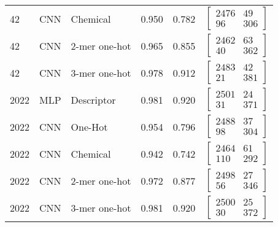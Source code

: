 \begin{table}[ht]
\begin{tabular}{llllll}
    42 & CNN & Chemical & 0.950 & 0.782 &
	$\begin{bmatrix}
        2476 & 49\\ 
        96 & 306
    \end{bmatrix}$
    \\

    42 & CNN & 2-mer one-hot & 0.965 & 0.855 & 
	$\begin{bmatrix}
        2462 & 63\\ 
        40 & 362
    \end{bmatrix}$
    \\

    42 & CNN & 3-mer one-hot & 0.978 & 0.912 & 
	$\begin{bmatrix}
        2483 & 42\\ 
        21 & 381
    \end{bmatrix}$
    \\\midrule

    
    2022 & MLP & Descriptor & 0.981 & 0.920 & 
	$\begin{bmatrix}
        2501 & 24\\ 
        31 & 371
    \end{bmatrix}$
    \\

    2022 & CNN & One-Hot & 0.954 & 0.796 &
	$\begin{bmatrix}
        2488 & 37\\ 
        98 & 304
    \end{bmatrix}$
    \\

    2022 & CNN & Chemical & 0.942 & 0.742 &
	$\begin{bmatrix}
        2464 & 61\\ 
        110 & 292
    \end{bmatrix}$
    \\

    2022 & CNN & 2-mer one-hot & 0.972 & 0.877 & 
	$\begin{bmatrix}
        2498 & 27\\ 
        56 & 346
    \end{bmatrix}$
    \\

    2022 & CNN & 3-mer one-hot & 0.981 & 0.920 & 
	$\begin{bmatrix}
        2500 & 25\\ 
        30 & 372
    \end{bmatrix}$
    \\

    
	\bottomrule
\end{tabular}
\end{table}